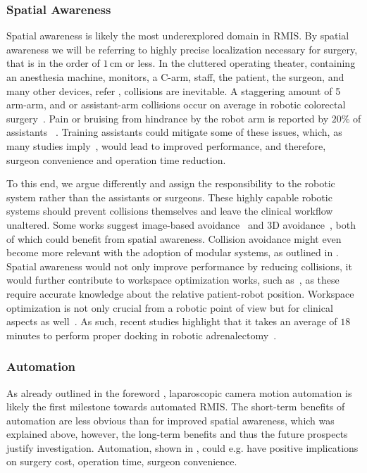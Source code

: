 \subsubsection{Spatial Awareness}
\label{in:sec:spatial_awareness}
Spatial awareness is likely the most underexplored domain in RMIS. By spatial awareness we will be referring to highly precise localization necessary for surgery, that is in the order of $1\,\text{cm}$ or less. In the cluttered operating theater, containing an anesthesia machine, monitors, a C-arm, staff, the patient, the surgeon, and many other devices, refer , collisions are inevitable. A staggering amount of 5 arm-arm, and or assistant-arm collisions occur on average in robotic colorectal surgery~\cite{wong2023improving}. Pain or bruising from hindrance by the robot arm is reported by $20\%$ of assistants ~\cite{van2019ergonomic}. Training assistants could mitigate some of these issues, which, as many studies imply~\cite{cimen2019does, mitsinikos2017does, kwon2020impact}, would lead to improved performance, and therefore, surgeon convenience and operation time reduction. 

To this end, we argue differently and assign the responsibility to the robotic system rather than the assistants or surgeons. These highly capable robotic systems should prevent collisions themselves and leave the clinical workflow unaltered. Some works suggest image-based avoidance~\cite{hameed2016towards} and 3D avoidance~\cite{li2023three}, both of which could benefit from spatial awareness. Collision avoidance might even become more relevant with the adoption of modular systems, as outlined in . Spatial awareness would not only improve performance by reducing collisions, it would further contribute to workspace optimization works, such as~\cite{hutzl2015knowledge, zelechowski2023automatic}, as these require accurate knowledge about the relative patient-robot position. Workspace optimization is not only crucial from a robotic point of view but for clinical aspects as well~\cite{alhusseinawi2023validation}. As such, recent studies highlight that it takes an average of $18$ minutes to perform proper docking in robotic adrenalectomy~\cite{feng2020robot}.

\subsubsection{Automation}
\label{in:sec:automation}
As already outlined in the foreword , laparoscopic camera motion automation is likely the first milestone towards automated RMIS. The short-term benefits of automation are less obvious than for improved spatial awareness, which was explained above, however, the long-term benefits and thus the future prospects justify investigation. Automation, shown in , could e.g. have positive implications on surgery cost, operation time, surgeon convenience.

